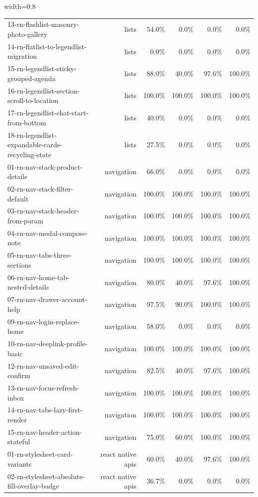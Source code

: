 \begin{table}[htbp]
\begin{adjustbox}{width=0.8\textwidth}
\begin{tabular}{lrrrrr}
13-rn-flashlist-masonry-photo-gallery & lists & 54.0\% & 0.0\% & 0.0\% & 0.0\% \\
14-rn-flatlist-to-legendlist-migration & lists & 0.0\% & 0.0\% & 0.0\% & 0.0\% \\
15-rn-legendlist-sticky-grouped-agenda & lists & 88.0\% & 40.0\% & 97.6\% & 100.0\% \\
16-rn-legendlist-section-scroll-to-location & lists & 100.0\% & 100.0\% & 100.0\% & 100.0\% \\
17-rn-legendlist-chat-start-from-bottom & lists & 40.0\% & 0.0\% & 0.0\% & 0.0\% \\
18-rn-legendlist-expandable-cards-recycling-state & lists & 27.5\% & 0.0\% & 0.0\% & 0.0\% \\
01-rn-nav-stack-product-details & navigation & 66.0\% & 0.0\% & 0.0\% & 0.0\% \\
02-rn-nav-stack-filter-default & navigation & 100.0\% & 100.0\% & 100.0\% & 100.0\% \\
03-rn-nav-stack-header-from-param & navigation & 100.0\% & 100.0\% & 100.0\% & 100.0\% \\
04-rn-nav-modal-compose-note & navigation & 100.0\% & 100.0\% & 100.0\% & 100.0\% \\
05-rn-nav-tabs-three-sections & navigation & 100.0\% & 100.0\% & 100.0\% & 100.0\% \\
06-rn-nav-home-tab-nested-details & navigation & 80.0\% & 40.0\% & 97.6\% & 100.0\% \\
07-rn-nav-drawer-account-help & navigation & 97.5\% & 90.0\% & 100.0\% & 100.0\% \\
09-rn-nav-login-replace-home & navigation & 58.0\% & 0.0\% & 0.0\% & 0.0\% \\
10-rn-nav-deeplink-profile-basic & navigation & 100.0\% & 100.0\% & 100.0\% & 100.0\% \\
12-rn-nav-unsaved-edit-confirm & navigation & 82.5\% & 40.0\% & 97.6\% & 100.0\% \\
13-rn-nav-focus-refresh-inbox & navigation & 100.0\% & 100.0\% & 100.0\% & 100.0\% \\
14-rn-nav-tabs-lazy-first-render & navigation & 100.0\% & 100.0\% & 100.0\% & 100.0\% \\
15-rn-nav-header-action-stateful & navigation & 75.0\% & 60.0\% & 100.0\% & 100.0\% \\
01-rn-stylesheet-card-variants & react native apis & 60.0\% & 40.0\% & 97.6\% & 100.0\% \\
02-rn-stylesheet-absolute-fill-overlay-badge & react native apis & 36.7\% & 0.0\% & 0.0\% & 0.0\% \\

\end{tabular}
\end{adjustbox}
\end{table}
